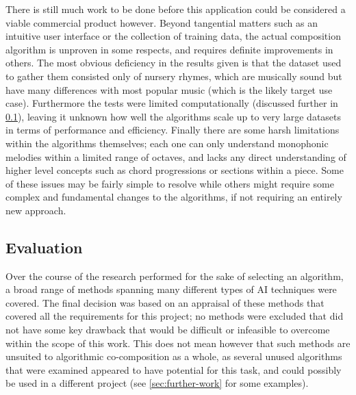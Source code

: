 \documentclass[ author={Stephen Livermore-Tozer},
				supervisor={Dr. Peter Flach},
				degree={MEng},
				title={Algorithmic Co-composition Using Machine Learning},
				subtitle={},
				type={research},
				year={2016} ]{dissertation}
\begin{document}
	There is still much work to be done before this application could be considered a viable commercial product however. Beyond tangential matters such as an intuitive user interface or the collection of training data, the actual composition algorithm is unproven in some respects, and requires definite improvements in others. The most obvious deficiency in the results given is that the dataset used to gather them consisted only of nursery rhymes, which are musically sound but have many differences with most popular music (which is the likely target use case). Furthermore the tests were limited computationally (discussed further in \ref{sec:project-evaluation}), leaving it unknown how well the algorithms scale up to very large datasets in terms of performance and efficiency. Finally there are some harsh limitations within the algorithms themselves; each one can only understand monophonic melodies within a limited range of octaves, and lacks any direct understanding of higher level concepts such as chord progressions or sections within a piece. Some of these issues may be fairly simple to resolve while others might require some complex and fundamental changes to the algorithms, if not requiring an entirely new approach.
	
	
	\subsection{Evaluation}
	\label{sec:project-evaluation}
	
	Over the course of the research performed for the sake of selecting an algorithm, a broad range of methods spanning many different types of AI techniques were covered. The final decision was based on an appraisal of these methods that covered all the requirements for this project; no methods were excluded that did not have some key drawback that would be difficult or infeasible to overcome within the scope of this work. This does not mean however that such methods are unsuited to algorithmic co-composition as a whole, as several unused algorithms that were examined appeared to have potential for this task, and could possibly be used in a different project (see \ref{sec:further-work} for some examples).
	
\end{document}
